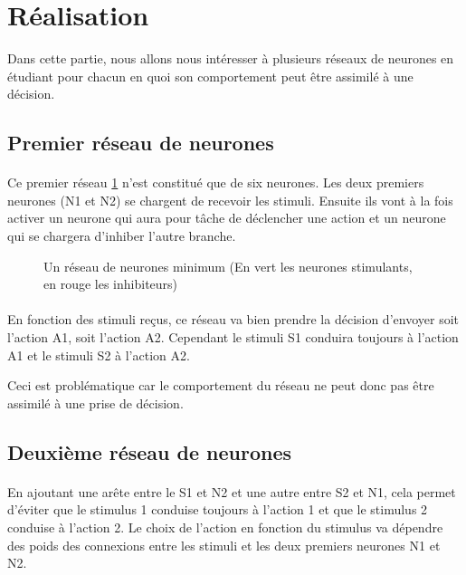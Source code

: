 \section{Réalisation}
Dans cette partie, nous allons nous intéresser à plusieurs réseaux de neurones
en étudiant pour chacun en quoi son comportement peut être assimilé à une 
décision.


\subsection{Premier réseau de neurones}
\paragraph{}
Ce premier réseau \ref{reseau1} n'est constitué que de six neurones. Les deux
premiers neurones (N1 et N2) se chargent de recevoir les stimuli. Ensuite ils 
vont à la fois activer un neurone qui aura pour tâche de déclencher une 
action et un neurone qui se chargera d'inhiber l'autre branche. 

\begin{figure}[!h]
  \begin{center}
    
  \end{center}
  \caption{Un réseau de neurones minimum (En vert les neurones stimulants, en rouge les inhibiteurs)}
  \label{reseau1}
\end{figure}

\paragraph{}
En fonction des stimuli reçus, ce réseau va bien prendre la décision 
d'envoyer soit l'action A1, soit l'action A2. Cependant le 
stimuli S1 conduira toujours à l'action A1 et le stimuli S2 à 
l'action A2.

Ceci est problématique car le comportement du réseau ne peut donc pas 
être assimilé à une prise de décision.

\subsection{Deuxième réseau de neurones}
\paragraph{}
En ajoutant une arête entre le S1 et N2 et une autre entre S2 et N1, cela
permet d'éviter que le stimulus 1 conduise toujours à l'action 1 et que le
stimulus 2 conduise à l'action 2. Le choix de l'action en fonction du stimulus
va dépendre des poids des connexions entre les stimuli et les deux premiers
neurones N1 et N2.

